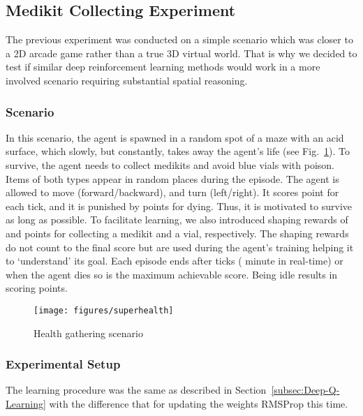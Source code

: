 \documentclass[english,american,conference, balance]{IEEEtran}
\begin{document}


\subsection{Medikit Collecting Experiment}

The previous experiment was conducted on a simple scenario which was
closer to a 2D arcade game rather than a true 3D virtual world. That
is why we decided to test if similar deep reinforcement learning methods
would work in a more involved scenario requiring substantial spatial
reasoning.

\subsubsection{Scenario}

In this scenario, the agent is spawned in a random spot of a maze
with an acid surface, which slowly, but constantly, takes away the
agent's life (see Fig.~\ref{fig:superhealth}). To survive, the agent
needs to collect medikits and avoid blue vials with poison. Items
of both types appear in random places during the episode. The agent
is allowed to move (forward/backward), and turn (left/right). It scores
 point for each tick, and it is punished by  points for
dying. Thus, it is motivated to survive as long as possible. To facilitate
learning, we also introduced shaping rewards of  and 
points for collecting a medikit and a vial, respectively. The shaping
rewards do not count to the final score but are used during the agent's
training helping it to `understand' its goal. Each episode ends after
 ticks ( minute in real-time) or when the agent dies so
 is the maximum achievable score. Being idle results in scoring
 points.

\begin{figure}
\begin{centering}
\texttt{[image: figures/superhealth]}
\par\end{centering}
\caption{\label{fig:superhealth}Health gathering scenario}
\end{figure}


\subsubsection{Experimental Setup}

The learning procedure was the same as described in Section~\ref{subsec:Deep-Q-Learning}
with the difference that for updating the weights RMSProp \cite{Tieleman2012}
this time.
\end{document}
